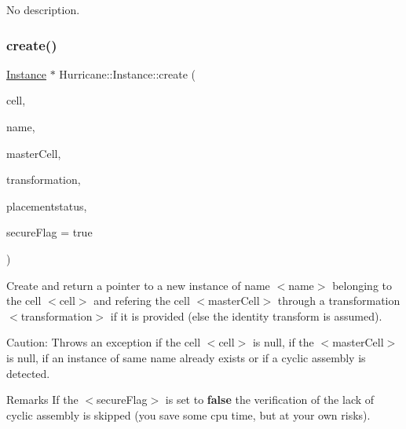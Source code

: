 No description. \mbox{\label{classHurricane_1_1Instance_ad5784305151e45c9d949a74bd85aaa36}} 
\subsubsection{\texorpdfstring{create()}{create()}\hspace{0.1cm}{\footnotesize\ttfamily [2/2]}}
{\footnotesize\ttfamily \mbox{\hyperlink{classHurricane_1_1Instance}{Instance}} $\ast$ Hurricane\+::\+Instance\+::create (\begin{DoxyParamCaption}\item[{\mbox{\hyperlink{classHurricane_1_1Cell}{Cell}} $\ast$}]{cell,  }\item[{const \mbox{\hyperlink{classHurricane_1_1Name}{Name}} \&}]{name,  }\item[{\mbox{\hyperlink{classHurricane_1_1Cell}{Cell}} $\ast$}]{master\+Cell,  }\item[{const \mbox{\hyperlink{classHurricane_1_1Transformation}{Transformation}} \&}]{transformation,  }\item[{const \mbox{\hyperlink{classHurricane_1_1Instance_1_1PlacementStatus}{Placement\+Status}} \&}]{placementstatus,  }\item[{bool}]{secure\+Flag = {\ttfamily true} }\end{DoxyParamCaption})\hspace{0.3cm}{\ttfamily [static]}}

Create and return a pointer to a new instance of name {\ttfamily $<$name$>$} belonging to the cell {\ttfamily $<$cell$>$} and refering the cell {\ttfamily $<$master\+Cell$>$} through a transformation {\ttfamily $<$transformation$>$} if it is provided (else the identity transform is assumed).

\begin{DoxyParagraph}{Caution\+: Throws an exception if the cell {\ttfamily $<$cell$>$} is null, if the }
{\ttfamily $<$master\+Cell$>$} is null, if an instance of same name already exists or if a cyclic assembly is detected.
\end{DoxyParagraph}
\begin{DoxyRemark}{Remarks}
If the {\ttfamily $<$secure\+Flag$>$} is set to {\bfseries false} the verification of the lack of cyclic assembly is skipped (you save some cpu time, but at your own risks). 
\end{DoxyRemark}
\mbox{\label{classHurricane_1_1Instance_aa48280b4d7127d283c89983cf7a42c23}} 
